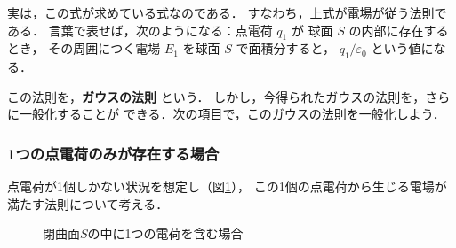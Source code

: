             実は，この式が求めている式なのである．
            すなわち，上式が電場が従う法則である．
            言葉で表せば，次のようになる：点電荷 $q_{1}$ が
            球面 $S$ の内部に存在するとき，
            その周囲につく電場 $E_{1}$ を球面 $S$ で面積分すると，
            $q_{1}/\varepsilon_{0}$ という値になる．

            この法則を，\textbf{ガウスの法則} という．
            しかし，今得られたガウスの法則を，さらに一般化することが
            できる．次の項目で，このガウスの法則を一般化しよう．

        \subsubsection{1つの点電荷のみが存在する場合}
            点電荷が1個しかない状況を想定し（図\ref{fig:Gauss_1tendenka}），
            この1個の点電荷から生じる電場が満たす法則について考える．
                        \begin{figure}[hbt]
                            \begin{center}
                                \caption{閉曲面$S$の中に1つの電荷を含む場合}
                                \label{fig:Gauss_1tendenka}
                            \end{center}
                        \end{figure}

